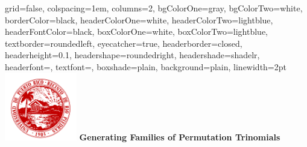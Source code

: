 \documentclass[landscape,final,paperwidth=24in,paperheight=36in]{baposter}
\begin{document}
\begin{poster}%
  {
  grid=false,
  colspacing=1em,
  columns=2,
  bgColorOne=gray,
  bgColorTwo=white,
  borderColor=black,
  headerColorOne=white,
  headerColorTwo=lightblue,
  headerFontColor=black,
  boxColorOne=white,
  boxColorTwo=lightblue,
  textborder=roundedleft,
  eyecatcher=true,
  headerborder=closed,
  headerheight=0.1\textheight,
  headershape=roundedright,
  headershade=shadelr,
  headerfont=\textsc, %
  textfont=\scriptsize{\setlength{\parindent}{1.5em}},
  boxshade=plain,
  background=plain,
  linewidth=2pt
  }
  {\includegraphics[height=8em,keepaspectratio=true]{images/logo_uprrp}} 
  {\bf {\LARGE Generating Families of Permutation Trinomials}}
  {}
  {%
    
  }

    \newcommand{\colouredcircle}{%
      \tikz{\useasboundingbox (-0.2em,-0.32em) rectangle(0.2em,0.32em); \draw[draw=black,fill=lightblue,line width=0.03em] (0,0) circle(0.18em);}}


\end{poster}
\end{document}
